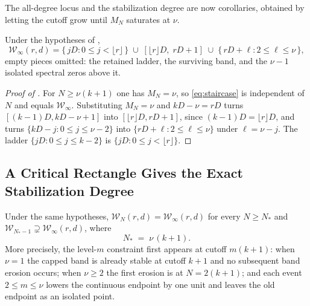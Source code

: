 \documentclass[11pt,letterpaper]{article}
\begin{document}
The all-degree locus and the stabilization degree are now corollaries, obtained
by letting the cutoff grow until $M_N$ saturates at $\nu$.

\begin{corollary}
\label{thm:stab}
Under the hypotheses of ,
\begin{equation}
  \mathcal{W}_\infty(r,d)
  =\bigl\{\,jD:0\le j<\lfloor r\rfloor\,\bigr\}
  \;\cup\;[\lfloor r\rfloor D,\;rD+1]
  \;\cup\;\bigl\{\,rD+\ell:2\le\ell\le\nu\,\bigr\},
  \label{eq:stab}
\end{equation}
empty pieces omitted: the retained ladder, the surviving band, and the $\nu-1$
isolated spectral zeros above it.
\end{corollary}

\begin{proof}[Proof of ]
For $N\ge\nu(k+1)$ one has $M_N=\nu$, so \eqref{eq:staircase} is independent of
$N$ and equals $\mathcal{W}_\infty$. Substituting $M_N=\nu$ and $kD-\nu=rD$ turns
$[(k-1)D,kD-\nu+1]$ into $[\lfloor r\rfloor D,rD+1]$, since $(k-1)D=\lfloor
r\rfloor D$, and turns $\{kD-j:0\le j\le\nu-2\}$ into
$\{rD+\ell:2\le\ell\le\nu\}$ under $\ell=\nu-j$. The ladder $\{jD:0\le j\le k-2\}$
is $\{jD:0\le j<\lfloor r\rfloor\}$.
\end{proof}

\subsection{A Critical Rectangle Gives the Exact Stabilization Degree}
\begin{corollary}
\label{thm:ncut}
Under the same hypotheses, $\mathcal{W}_N(r,d)=\mathcal{W}_\infty(r,d)$ for every
$N\ge N_*$ and $\mathcal{W}_{N_*-1}\supsetneq\mathcal{W}_\infty(r,d)$, where
\begin{equation}
  N_*\;=\;\nu\,(k+1).
  \label{eq:ncut}
\end{equation}
More precisely, the level-$m$ constraint first appears at cutoff $m(k+1)$: when
$\nu=1$ the capped band is already stable at cutoff $k+1$ and no subsequent band
erosion occurs; when $\nu\ge2$ the first erosion is at $N=2(k+1)$;
and each event $2\le m\le\nu$ lowers the continuous endpoint by one unit and
leaves the old endpoint as an isolated point.
\end{corollary}
\end{document}
